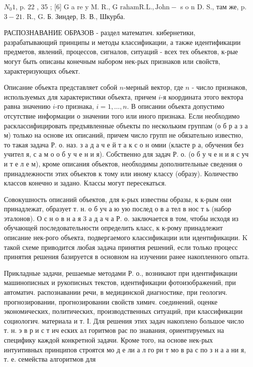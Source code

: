 \documentclass[10pt]{article}
\begin{document}
$N_{0} 1$, p. 22 , 35 ; [6] G a re y M. R., G $\mathrm{raham} \mathrm{R.} \mathrm{L.,} \mathrm{J} \mathrm{o} \mathrm{h} \mathrm{n-}$ s o n D. S., там же, p. $3-21$. R., G. Б. Зиндер, B. В., Шкурба.



РАСПОЗНАВАНИЕ ОБРАЗОВ - раздел математич. кибернетики, разрабатывающий принципы и методы классификации, а также идентификации предметов, явлений, процессов, сигналов, ситуаций - всех тех объектов, к-рые могут быть описаны конечным набором нек-рых признаков или свойств, характеризующих объект.



Описание объекта представляет собой $n$-мерный вектор, где $n$ - число признаков, используемых для характеристики объекта, причем $i$-я координата этого вектора равна значению $i$-го признака, $i=1, \ldots, n$. В описании объекта допустимо отсутствие информации о значении того или иного признака. Если необходимо расклассифицировать предъявленные объекты по нескольким группам (о б р а з а м) только на основе их описаний, причем число групп не обязательно известно, то такая задача Р. о. наз. з а д а ч е й т а к с о н омии (класте р а, обучения без учител я, с а м о о б у ч е н и я). Собственно для задач Р. о. (о б у ч е н и я с уч и т е л е м), кроме описания объектов, необходимы дополнительные сведения о принадлежности этих объектов к тому или иному классу (образу). Количество классов конечно и задано. Классы могут пересекаться.



Совокушность описаний объектов, для к-рых известны образы, к к-рым они принадлежат, образует т. н. о б уч а ю ую послед о в а тел в нос т ь (набор эталонов). О с н о в н а я 3 а д а ч а Р. о. заключается в том, чтобы исходя из обучающей последовательности определить класс, к к-рому принадлежит описание нек-рого объекта, подвергаемого классификации или идентификации. $\mathrm{K}$ такой схеме приводится любая задача принятия решений, если только процесс принятия решения базируется в основном на изучении ранее накопленного опыта.



Прикладные задачи, решаемые методами Р. о., возникают при идентификации машинописных и рукописных текстов, идентификации фотоизображений, при автоматич. распознавании речи, в медицинской диагностике, при геологич. прогнозировании, прогнозировании свойств химич. соединений, оценке экономических, политических, производственных ситуаций, при классификации социологич. материала и т. І. Для решения этих задач накоплено большое число т. н. э в р и с т ич еских ал горитмов рас по знавания, ориентируемых на специфику каждой конкретной задачи. Кроме того, на основе нек-рых интуитивных принципов строятся мо д е ли а л го ри т мо в ра с по з н а а ни я, т. е. семейства алгоритмов для
\end{document}
